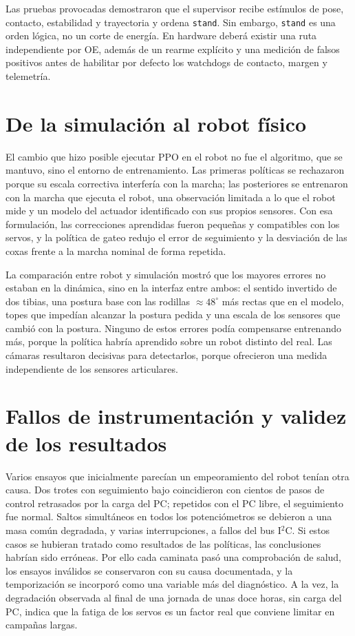 Las pruebas provocadas demostraron que el supervisor recibe estímulos de pose,
contacto, estabilidad y trayectoria y ordena \texttt{stand}. Sin embargo,
\texttt{stand} es una orden lógica, no un corte de energía. En hardware deberá
existir una ruta independiente por OE, además de un rearme explícito y una
medición de falsos positivos antes de habilitar por defecto los watchdogs de
contacto, margen y telemetría.

\section{De la simulación al robot físico}

El cambio que hizo posible ejecutar PPO en el robot no fue el algoritmo, que se
mantuvo, sino el entorno de entrenamiento. Las primeras políticas se rechazaron
porque su escala correctiva interfería con la marcha; las posteriores se
entrenaron con la marcha que ejecuta el robot, una observación limitada a lo que
el robot mide y un modelo del actuador identificado con sus propios sensores.
Con esa formulación, las correcciones aprendidas fueron pequeñas y compatibles
con los servos, y la política de gateo redujo el error de seguimiento y la
desviación de las coxas frente a la marcha nominal de forma repetida.

La comparación entre robot y simulación mostró que los mayores errores no
estaban en la dinámica, sino en la interfaz entre ambos: el sentido invertido de
dos tibias, una postura base con las rodillas $\approx48^\circ$ más rectas que en
el modelo, topes que impedían alcanzar la postura pedida y una escala de los
sensores que cambió con la postura. Ninguno de estos errores podía compensarse
entrenando más, porque la política habría aprendido sobre un robot distinto del
real. Las cámaras resultaron decisivas para detectarlos, porque ofrecieron una
medida independiente de los sensores articulares.

\section{Fallos de instrumentación y validez de los resultados}

Varios ensayos que inicialmente parecían un empeoramiento del robot tenían otra
causa. Dos trotes con seguimiento bajo coincidieron con cientos de pasos de
control retrasados por la carga del PC; repetidos con el PC libre, el
seguimiento fue normal. Saltos simultáneos en todos los potenciómetros se
debieron a una masa común degradada, y varias interrupciones, a fallos del bus
I$^2$C. Si estos casos se hubieran tratado como resultados de las políticas, las
conclusiones habrían sido erróneas. Por ello cada caminata pasó una comprobación
de salud, los ensayos inválidos se conservaron con su causa documentada, y la
temporización se incorporó como una variable más del diagnóstico. A la vez, la
degradación observada al final de una jornada de unas doce horas, sin carga del
PC, indica que la fatiga de los servos es un factor real que conviene limitar
en campañas largas.

